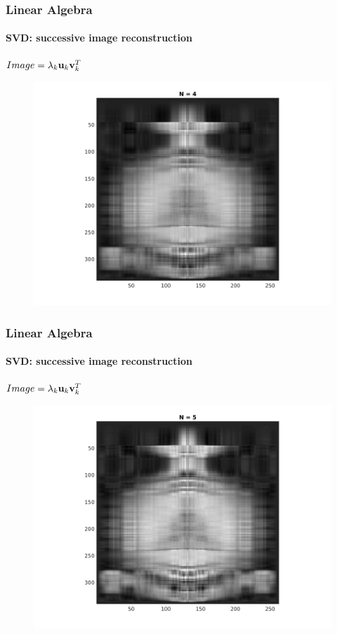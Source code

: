 \documentclass[hyperref={pdfpagelabels=true}]{beamer}
\begin{document}
\begin{frame}
\frametitle{Linear Algebra}
\framesubtitle{SVD: successive image reconstruction} 
\small{
\begin{center}
$Image = \lambda_k{\bf u}_k {\bf v}_k^T$
\end{center}}
\begin{figure}[!htb]
\centering
\includegraphics [scale=0.48]{n/b4.png}
\end{figure}
\end{frame}

\begin{frame}
\frametitle{Linear Algebra}
\framesubtitle{SVD: successive image reconstruction} 
\small{
\begin{center}
$Image = \lambda_k{\bf u}_k {\bf v}_k^T$
\end{center}}
\begin{figure}[!htb]
\centering
\includegraphics [scale=0.48]{n/b5.png}
\end{figure}
\end{frame}
\end{document}
